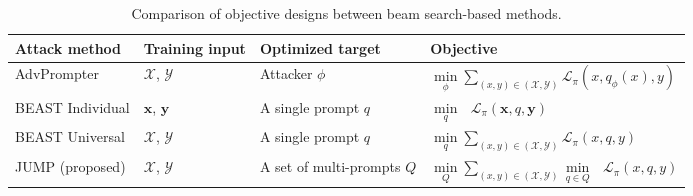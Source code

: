 \renewcommand{\arraystretch}{1.4}
\begin{table*}[ht]
\centering
\begin{tabular}{l|p{2cm}p{2.5cm}p{4.5cm}}
\hline

\small \textbf{Attack method}  & \small \textbf{Training input} & \small \centering \textbf{Optimized target} & \quad \quad \quad \quad \small \textbf{Objective} 
\\ 
\hline
\small AdvPrompter \cite{Paulus2024AdvPrompterFA} & \centering \small $\mathcal{X}$, $\mathcal{Y}$ & \centering \small Attacker $\phi$ & \quad \small $\underset{\phi}{\min} \underset{(x, y) \in (\mathcal{X}, \mathcal{Y})}{\sum} \mathcal{L}_{\pi}(x, q_{\phi}(x), y)$ \\ 
\small BEAST \tiny Individual \small \cite{Sadasivan2024FastAA} & \centering \small $\mathbf{x}$, $\mathbf{y}$ & \centering \small A single prompt $q$ &  \quad \small $\underset{q}{\min}\text{ }\mathcal{L}_{\pi}(\mathbf{x}, q, \mathbf{y})$ \\ 
\small BEAST \tiny Universal \small \cite{Sadasivan2024FastAA} & \centering \small $\mathcal{X}$, $\mathcal{Y}$ & \centering \small A single prompt $q$ &  \quad \small $\underset{q}{\min} \underset{(x, y) \in (\mathcal{X}, \mathcal{Y})}{\sum} \mathcal{L}_{\pi}(x, q, y)$ \\ 
\hline 
\small JUMP (proposed) & \centering \small $\mathcal{X}$, $\mathcal{Y}$ & \centering  \small A set of multi-prompts $Q$ &  \quad \small $\underset{Q}{\min} \underset{(x, y) \in (\mathcal{X}, \mathcal{Y})}{\sum} \underset{q \in Q}{\min} \text{ } \mathcal{L}_{\pi}(x, q, y)$ 
\\ 
\hline

\end{tabular}
\caption{Comparison of objective designs between beam search-based methods.}
\label{table:comparison_obj}
\end{table*}